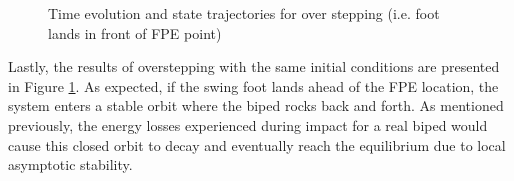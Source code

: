 \begin{figure}[!h]
	\begin{center}
	\end{center}
  	\caption{Time evolution and state trajectories for over stepping (i.e. foot lands in front of FPE point)}
	\label{sim:over}
\end{figure}

Lastly, the results of overstepping with the same initial conditions are presented in Figure \ref{sim:over}. As expected, if the swing foot lands ahead of the FPE location, the system enters a stable orbit where the biped rocks back and forth. As mentioned previously, the energy losses experienced during impact for a real biped would cause this closed orbit to decay and eventually reach the equilibrium due to local asymptotic stability. 

